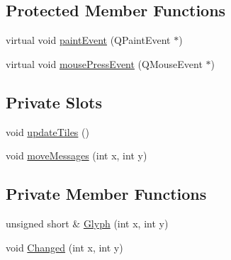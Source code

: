 \subsection*{Protected Member Functions}
\begin{DoxyCompactItemize}
\item 
virtual void \hyperlink{classNetHackQtMapWindow_a276b7eab16f183c763ddde350484773d}{paint\+Event} (Q\+Paint\+Event $\ast$)
\item 
virtual void \hyperlink{classNetHackQtMapWindow_a40def91e6af4c962541764cd1cb4a5d7}{mouse\+Press\+Event} (Q\+Mouse\+Event $\ast$)
\end{DoxyCompactItemize}
\subsection*{Private Slots}
\begin{DoxyCompactItemize}
\item 
void \hyperlink{classNetHackQtMapWindow_a75cf9a4b154a864adb15e76b357d18d7}{update\+Tiles} ()
\item 
void \hyperlink{classNetHackQtMapWindow_a611ce29ff3c024f682c387bdefa69f5a}{move\+Messages} (int x, int y)
\end{DoxyCompactItemize}
\subsection*{Private Member Functions}
\begin{DoxyCompactItemize}
\item 
unsigned short \& \hyperlink{classNetHackQtMapWindow_a928cbce509d22527b8e74f4cfd3c1626}{Glyph} (int x, int y)
\item 
void \hyperlink{classNetHackQtMapWindow_a5283a29be99f912267502a18d9fb9c5e}{Changed} (int x, int y)
\end{DoxyCompactItemize}
